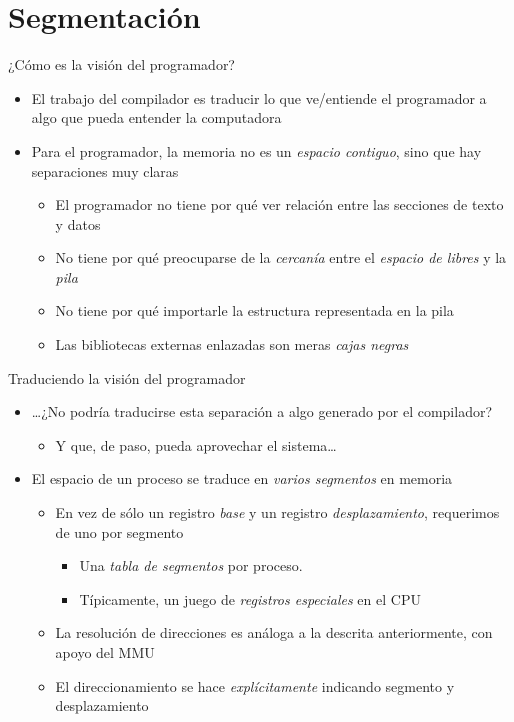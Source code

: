 \documentclass[presentation]{beamer}
\begin{document}
\section{Segmentación}
\label{sec:org0a54620}
\begin{frame}[label={sec:orgdaa4c29}]{¿Cómo es la visión del programador?}
\begin{itemize}
\item El trabajo del compilador es traducir lo que ve/entiende el
programador a algo que pueda entender la computadora
\item Para el programador, la memoria no es un \emph{espacio contiguo}, sino
que hay separaciones muy claras
\begin{itemize}
\item El programador no tiene por qué ver relación entre las secciones
de texto y datos
\item No tiene por qué preocuparse de la \emph{cercanía} entre el \emph{espacio de
libres} y la \emph{pila}
\item No tiene por qué importarle la estructura representada en la pila
\item Las bibliotecas externas enlazadas son meras \emph{cajas negras}
\end{itemize}
\end{itemize}
\end{frame}

\begin{frame}[label={sec:org215f637}]{Traduciendo la visión del programador}
\begin{itemize}
\item \ldots{}¿No podría traducirse esta separación a algo generado por el
compilador?
\begin{itemize}
\item Y que, de paso, pueda aprovechar el sistema\ldots{}
\end{itemize}
\item El espacio de un proceso se traduce en \emph{varios segmentos} en memoria
\begin{itemize}
\item En vez de sólo un registro \emph{base} y un registro \emph{desplazamiento},
requerimos de uno por segmento
\begin{itemize}
\item Una \emph{tabla de segmentos} por proceso.
\item Típicamente, un juego de \emph{registros especiales} en el CPU
\end{itemize}
\item La resolución de direcciones es análoga a la descrita
anteriormente, con apoyo del MMU
\item El direccionamiento se hace \emph{explícitamente} indicando segmento y
desplazamiento
\end{itemize}
\end{itemize}
\end{frame}
\end{document}
